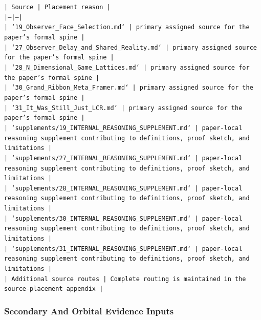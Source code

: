 \documentclass[11pt]{article}
\begin{document}
\noindent\texttt{| Source | Placement reason |}\\
\noindent\texttt{|---|---|}\\
\noindent\texttt{| `19\_Observer\_Face\_Selection.md` | primary assigned source for the paper's formal spine |}\\
\noindent\texttt{| `27\_Observer\_Delay\_and\_Shared\_Reality.md` | primary assigned source for the paper's formal spine |}\\
\noindent\texttt{| `28\_N\_Dimensional\_Game\_Lattices.md` | primary assigned source for the paper's formal spine |}\\
\noindent\texttt{| `30\_Grand\_Ribbon\_Meta\_Framer.md` | primary assigned source for the paper's formal spine |}\\
\noindent\texttt{| `31\_It\_Was\_Still\_Just\_LCR.md` | primary assigned source for the paper's formal spine |}\\
\noindent\texttt{| `supplements/19\_INTERNAL\_REASONING\_SUPPLEMENT.md` | paper-local reasoning supplement contributing to definitions, proof sketch, and limitations |}\\
\noindent\texttt{| `supplements/27\_INTERNAL\_REASONING\_SUPPLEMENT.md` | paper-local reasoning supplement contributing to definitions, proof sketch, and limitations |}\\
\noindent\texttt{| `supplements/28\_INTERNAL\_REASONING\_SUPPLEMENT.md` | paper-local reasoning supplement contributing to definitions, proof sketch, and limitations |}\\
\noindent\texttt{| `supplements/30\_INTERNAL\_REASONING\_SUPPLEMENT.md` | paper-local reasoning supplement contributing to definitions, proof sketch, and limitations |}\\
\noindent\texttt{| `supplements/31\_INTERNAL\_REASONING\_SUPPLEMENT.md` | paper-local reasoning supplement contributing to definitions, proof sketch, and limitations |}\\
\noindent\texttt{| Additional source routes | Complete routing is maintained in the source-placement appendix |}\\

\subsubsection*{Secondary And Orbital Evidence Inputs}
\end{document}
